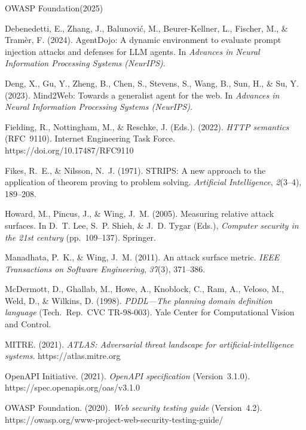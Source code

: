 \documentclass[11pt,a4paper]{article}
\begin{document}
\begin{thebibliography}{OWASP Foundation(2025)}

Debenedetti, E., Zhang, J., Balunovi\'c, M., Beurer-Kellner, L., Fischer, M., \&
Tram\`er, F. (2024). AgentDojo: A dynamic environment to evaluate prompt injection
attacks and defenses for LLM agents. In \emph{Advances in Neural Information Processing
Systems (NeurIPS)}.

Deng, X., Gu, Y., Zheng, B., Chen, S., Stevens, S., Wang, B., Sun, H., \& Su, Y.
(2023). Mind2Web: Towards a generalist agent for the web. In \emph{Advances in Neural
Information Processing Systems (NeurIPS)}.

Fielding, R., Nottingham, M., \& Reschke, J. (Eds.). (2022). \emph{HTTP semantics}
(RFC~9110). Internet Engineering Task Force. https://doi.org/10.17487/RFC9110

Fikes, R.~E., \& Nilsson, N.~J. (1971). STRIPS: A new approach to the application of
theorem proving to problem solving. \emph{Artificial Intelligence}, \emph{2}(3--4),
189--208.

Howard, M., Pincus, J., \& Wing, J.~M. (2005). Measuring relative attack surfaces. In
D.~T. Lee, S.~P. Shieh, \& J.~D. Tygar (Eds.), \emph{Computer security in the 21st
century} (pp.~109--137). Springer.

Manadhata, P.~K., \& Wing, J.~M. (2011). An attack surface metric. \emph{IEEE
Transactions on Software Engineering}, \emph{37}(3), 371--386.

McDermott, D., Ghallab, M., Howe, A., Knoblock, C., Ram, A., Veloso, M., Weld, D., \&
Wilkins, D. (1998). \emph{PDDL---The planning domain definition language} (Tech.\ Rep.\
CVC TR-98-003). Yale Center for Computational Vision and Control.

MITRE. (2021). \emph{ATLAS: Adversarial threat landscape for artificial-intelligence
systems}. https://atlas.mitre.org

OpenAPI Initiative. (2021). \emph{OpenAPI specification} (Version~3.1.0).
https://spec.openapis.org/oas/v3.1.0

OWASP Foundation. (2020). \emph{Web security testing guide} (Version~4.2).
https://owasp.org/www-project-web-security-testing-guide/


\end{thebibliography}
\end{document}
